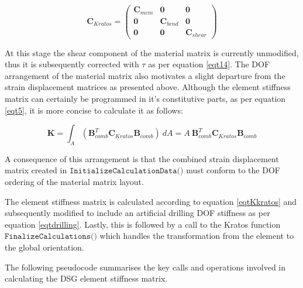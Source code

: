 \begin{equation} 
\mathbf{C}_{Kratos} =  
\begin{pmatrix}
	\mathbf{C}_{mem} & \mathbf{0} & \mathbf{0} \\
	\mathbf{0} & \mathbf{C}_{bend} & \mathbf{0} \\
	\mathbf{0} & 	\mathbf{0} & \mathbf{C}_{shear}
\end{pmatrix}
\label{eqtCkratos}
\end{equation} 

At this stage the shear component of the material matrix is currently unmodified, thus it is subsequently corrected with $\tau$ as per equation \eqref{eqt14}. The DOF arrangement of the material matrix also motivates a slight departure from the strain displacement matrices as presented above. Although the element stiffness matrix can certainly be programmed in it's constitutive parts, as per equation \eqref{eqt5}, it is more concise to calculate it as follows:

\begin{equation} 
\mathbf{K} = \int_A  (\mathbf{B}_{comb}^T \mathbf{C}_{Kratos} \mathbf{B}_{comb} )\ dA
= A\  \mathbf{B}_{comb}^T \mathbf{C}_{Kratos} \mathbf{B}_{comb} 
\label{eqtKkratos}
\end{equation}

A consequence of this arrangement is that the combined strain displacement matrix created in $\texttt{InitializeCalculationData()}$ must conform to the DOF ordering of the material matrix layout.

The element stiffness matrix is calculated according to equation \eqref{eqtKkratos} and subsequently modified to include an artificial drilling DOF stiffness as per equation \eqref{eqtdrilling}. Lastly, this is followed by a call to the Kratos function $\texttt{FinalizeCalculations()}$ which handles the transformation from the element to the global orientation.

The following pseudocode summarises the key calls and operations involved in calculating the DSG element stiffness matrix.

